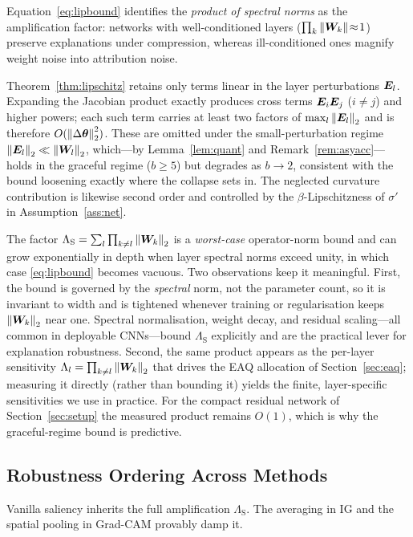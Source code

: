 Equation~\eqref{eq:lipbound} identifies the \emph{product of spectral norms} as
the amplification factor: networks with well-conditioned layers
($\prod_k\left\lVert\bm{W}_k\right\rVert\!\approx\!1$) preserve explanations under compression,
whereas ill-conditioned ones magnify weight noise into attribution noise.

\begin{remark}
\label{rem:firstorder}
Theorem~\ref{thm:lipschitz} retains only terms linear in the layer perturbations
$\bm{E}_l$. Expanding the Jacobian product exactly produces cross terms
$\bm{E}_i\bm{E}_j$ ($i\ne j$) and higher powers; each such term carries at least two
factors of $\max_l\left\lVert\bm{E}_l\right\rVert_2$ and is therefore
$O(\left\lVert\Delta\bm{\theta}\right\rVert_2^2)$. These are omitted under the small-perturbation
regime $\left\lVert\bm{E}_l\right\rVert_2\ll\left\lVert\bm{W}_l\right\rVert_2$, which---by Lemma~\ref{lem:quant} and
Remark~\ref{rem:asyacc}---holds in the graceful regime ($b\ge5$) but degrades as
$b\to2$, consistent with the bound loosening exactly where the collapse sets in.
The neglected curvature contribution is likewise second order and controlled by
the $\beta$-Lipschitzness of $\sigma'$ in Assumption~\ref{ass:net}.
\end{remark}

\begin{remark}
\label{rem:spectral}
The factor $\Lambda_{\mathrm S}=\sum_l\prod_{k\ne l}\left\lVert\bm{W}_k\right\rVert_2$ is a
\emph{worst-case} operator-norm bound and can grow exponentially in depth when
layer spectral norms exceed unity, in which case \eqref{eq:lipbound} becomes
vacuous. Two observations keep it meaningful. First, the bound is governed by the
\emph{spectral} norm, not the parameter count, so it is invariant to width and is
tightened whenever training or regularisation keeps $\left\lVert\bm{W}_k\right\rVert_2$ near one.
Spectral normalisation, weight decay, and residual scaling---all common in
deployable CNNs---bound $\Lambda_{\mathrm S}$ explicitly and are the practical
lever for explanation robustness. Second, the same product appears as the
per-layer sensitivity $\Lambda_l=\prod_{k\ne l}\left\lVert\bm{W}_k\right\rVert_2$ that drives the
EAQ allocation of Section~\ref{sec:eaq}; measuring it directly (rather than
bounding it) yields the finite, layer-specific sensitivities we use in practice.
For the compact residual network of Section~\ref{sec:setup} the measured product
remains $O(1)$, which is why the graceful-regime bound is predictive.
\end{remark}

\subsection{Robustness Ordering Across Methods}
Vanilla saliency inherits the full amplification $\Lambda_{\mathrm S}$. The
averaging in IG and the spatial pooling in Grad-CAM provably damp it.

